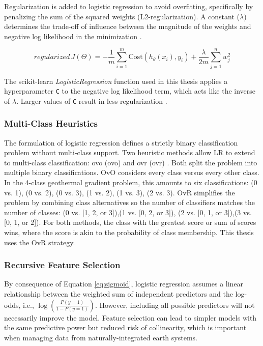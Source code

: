 Regularization is added to logistic regression to avoid overfitting, specifically by penalizing the sum of the squared weights (L2-regularization). A constant ($\lambda$) determines the trade-off of influence between the magnitude of the weights and negative log likelihood in the minimization \citep{ng_regularization_2011}.

\begin{equation}
\label{eq:logreg_cost_reg}
    regularized\,J(\Theta) = -\frac{1}{m}\sum_{i=1}^{m}{\text{Cost}(h_{\theta}(x_i),y_i) + \frac{\lambda}{2m}\sum_{j=1}^{n}{w_j^2}}
\end{equation}

The scikit-learn \textit{LogisticRegression} function used in this thesis applies a hyperparameter \verb|C| to the negative log likelihood term, which acts like the inverse of $\lambda$. Larger values of \verb|C| result in less regularization \citep{scikit-learn_logistic_2021}.

\subsubsection{Multi-Class Heuristics} \label{ch3:lr_multiclass}
The formulation of logistic regression defines a strictly binary classification problem without multi-class support. Two heuristic methods allow LR to extend to multi-class classification: \acrlong{ovo} (\acrshort{ovo}) and \acrlong{ovr} (\acrshort{ovr}) \citep{brownlee_one-vs-rest_2020,scikit-learn_multiclass_2021}. Both split the problem into multiple binary classifications. OvO considers every class versus every other class. In the 4-class geothermal gradient problem, this amounts to six classifications: {(0 vs. 1), (0 vs. 2), (0 vs. 3), (1 vs. 2), (1 vs. 3), (2 vs. 3)}. OvR simplifies the problem by combining class alternatives so the number of classifiers matches the number of classes: {(0 vs. [1, 2, or 3]),(1 vs. [0, 2, or 3]), (2 vs. [0, 1, or 3]),(3 vs. [0, 1, or 2])}. For both methods, the class with the greatest score or sum of scores wins, where the score is akin to the probability of class membership. This thesis uses the OvR strategy.

\subsubsection{Recursive Feature Selection} \label{ch3:lr_rfe}
By consequence of Equation \ref{eq:sigmoid}, logistic regression assumes a linear relationship between the weighted sum of independent predictors and the log-odds, i.e., $\log(\frac{P(y=1)}{1-P(y=1)})$. However, including all possible predictors will not necessarily improve the model. Feature selection can lead to simpler models with the same predictive power but reduced risk of collinearity, which is important when managing data from naturally-integrated earth systems.

